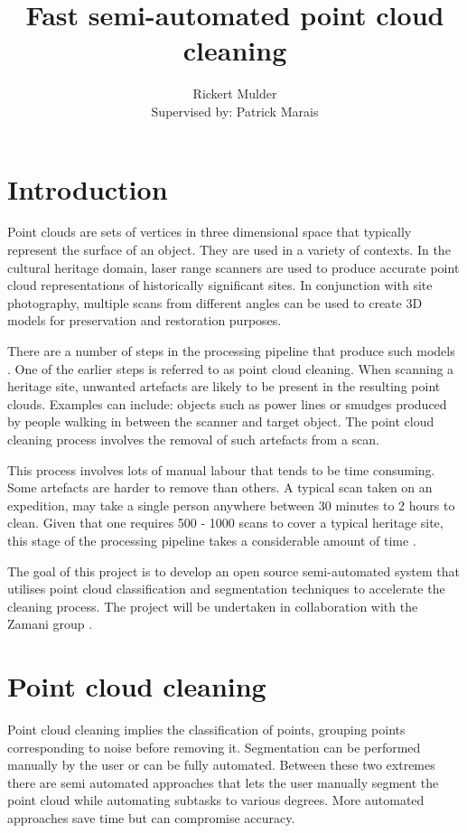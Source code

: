 \documentclass[10pt,twocolumn]{article}
\title{Fast semi-automated point cloud cleaning}
\author{Rickert Mulder\\ Supervised by: Patrick Marais}
\date{}
\begin{document}
\maketitle

\section{Introduction}
Point clouds are sets of vertices in three dimensional space that typically represent the surface of an object. They are used in a variety of contexts. In the cultural heritage domain, laser range scanners are used to produce accurate point cloud representations of historically significant sites. In conjunction with site photography, multiple scans from different angles can be used to create 3D models for preservation and restoration purposes.


There are a number of steps in the processing pipeline that produce such models \cite{Ruther2011}. One of the earlier steps is referred to as point cloud cleaning. When scanning a heritage site, unwanted artefacts are likely to be present in the resulting point clouds. Examples can include: objects such as power lines or smudges produced by people walking in between the scanner and target object. The point cloud cleaning process involves the removal of such artefacts from a scan.

This process involves lots of manual labour that tends to be time consuming. Some artefacts are harder to remove than others. A typical scan taken on an expedition, may take a single person anywhere between 30 minutes to 2 hours to clean. Given that one requires 500 - 1000 scans to cover a typical heritage site, this stage of the processing pipeline takes a considerable amount of time \cite{Ruther2011}.

The goal of this project is to develop an open source semi-automated system that utilises point cloud classification and segmentation techniques to accelerate the cleaning process. The project will be undertaken in collaboration with the Zamani group \cite{Ruther2011}.

\section{Point cloud cleaning}
Point cloud cleaning implies the classification of points, grouping points corresponding to noise before removing it. Segmentation can be performed manually by the user or can be fully automated. Between these two extremes there are semi automated approaches that lets the user manually segment the point cloud while automating subtasks to various degrees. More automated approaches save time but can compromise accuracy.
\end{document}
